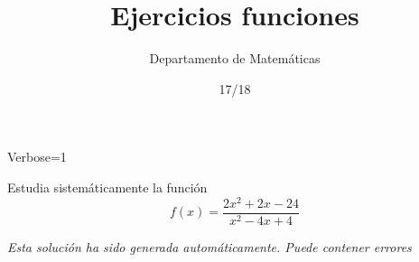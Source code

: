 \documentclass[palatino,nosec]{Docencia}
\title{Ejercicios funciones}
\author{Departamento de Matemáticas}
\date{17/18}
\newcommand{\fullAnalisis}[1]{
	
	
	\newpage
}
\begin{document}
\pagestyle{plain}

\newif\ifverbose
\verbosetrue

\ifverbose
\begin{sagesilent}
	Verbose=1
\end{sagesilent}
\else
\begin{sagesilent}
	Verbose=0
\end{sagesilent}
\fi



\begin{problem} Estudia sistemáticamente la función
	\[
		f(x) = \frac{2x^2+2x-24}{x^2-4x+4}
	\]
\solution

\textit{Esta solución ha sido generada automáticamente. Puede contener errores}

\fullAnalisis{tex/fun}

\end{problem}
\end{document}

